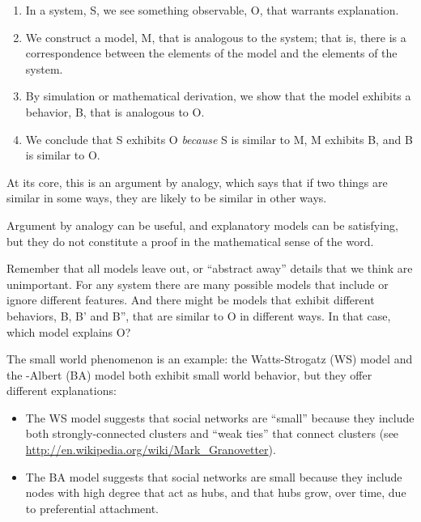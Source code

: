 \documentclass[10pt]{book}
\begin{document}
\begin{enumerate}

\item In a system, S, we see something observable, O, that warrants
  explanation.

\item We construct a model, M, that is analogous to the system; that
  is, there is a correspondence between the elements of the model and
  the elements of the system.

\item By simulation or mathematical derivation, we show that the model
  exhibits a behavior, B, that is analogous to O.

\item We conclude that S exhibits O {\em because} S is similar to M, M
  exhibits B, and B is similar to O.

\end{enumerate}

At its core, this is an argument by analogy, which says that if two
things are similar in some ways, they are likely to be similar in
other ways.

Argument by analogy can be useful, and explanatory models can be
satisfying, but they do not constitute a proof in the mathematical
sense of the word.

Remember that all models leave out, or ``abstract away''
details that we think are unimportant.  For any system there
are many possible models that include or ignore different features.
And there might be models that exhibit different behaviors,
B, B' and B'', that are similar to O in different ways.
In that case, which model explains O?

The small world phenomenon is an example: the
Watts-Strogatz (WS) model and the \Barabasi-Albert (BA) model
both exhibit small world behavior, but they offer different
explanations:

\begin{itemize}

\item The WS model suggests that social networks are ``small'' because
  they include both strongly-connected clusters and ``weak ties'' that
  connect clusters (see \url{http://en.wikipedia.org/wiki/Mark_Granovetter}).

\item The BA model suggests that social networks are small because
  they include nodes with high degree that act as hubs, and that
  hubs grow, over time, due to preferential attachment.

\end{itemize}
\end{document}
